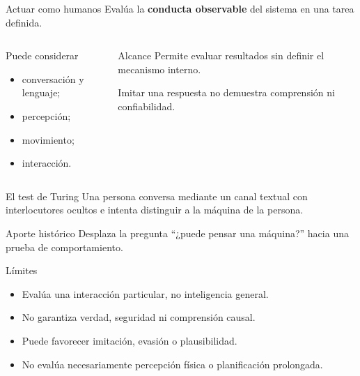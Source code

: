 \documentclass[aspectratio=169,11pt]{beamer}
\newcommand{\concepto}[1]{\textcolor{UAPTeal}{\textbf{#1}}}
\begin{document}
\begin{frame}{Actuar como humanos}
  Evalúa la \concepto{conducta observable} del sistema en una tarea definida.
  \begin{columns}[T]
      \begin{block}{Puede considerar}
        \begin{itemize}
          \item conversación y lenguaje;
          \item percepción;
          \item movimiento;
          \item interacción.
        \end{itemize}
      \end{block}
      \begin{block}{Alcance}
        Permite evaluar resultados sin definir el mecanismo interno.

        \vspace{0.5em}
        Imitar una respuesta no demuestra comprensión ni confiabilidad.
      \end{block}
  \end{columns}
\end{frame}

\begin{frame}{El test de Turing}
  Una persona conversa mediante un canal textual con interlocutores ocultos e intenta distinguir a la máquina de la persona.
  \begin{block}{Aporte histórico}
    Desplaza la pregunta ``¿puede pensar una máquina?'' hacia una prueba de comportamiento.
  \end{block}
  \begin{block}{Límites}
    \begin{itemize}
      \item Evalúa una interacción particular, no inteligencia general.
      \item No garantiza verdad, seguridad ni comprensión causal.
      \item Puede favorecer imitación, evasión o plausibilidad.
      \item No evalúa necesariamente percepción física o planificación prolongada.
    \end{itemize}
  \end{block}
\end{frame}
\end{document}
